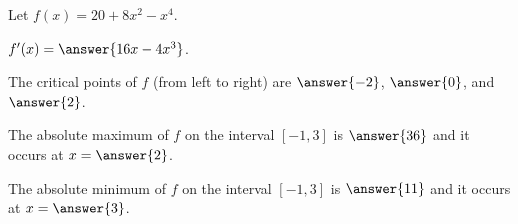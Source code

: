 \documentclass{ximera}
\author{Nela Lakos \and Kyle Parsons}
\begin{document}
\begin{exercise}

Let $f(x) = 20 + 8x^2 - x^4$.

$f'(x) = \answer{16x-4x^3}$.

The critical points of $f$ (from left to right) are $\answer{-2}$, $\answer{0}$, and $\answer{2}$.

The absolute maximum of $f$ on the interval $[-1,3]$ is $\answer{36}$ and it occurs at $x=\answer{2}$.

The absolute minimum of $f$ on the interval $[-1,3]$ is $\answer{11}$ and it occurs at $x=\answer{3}$.



\end{exercise}
\end{document}

